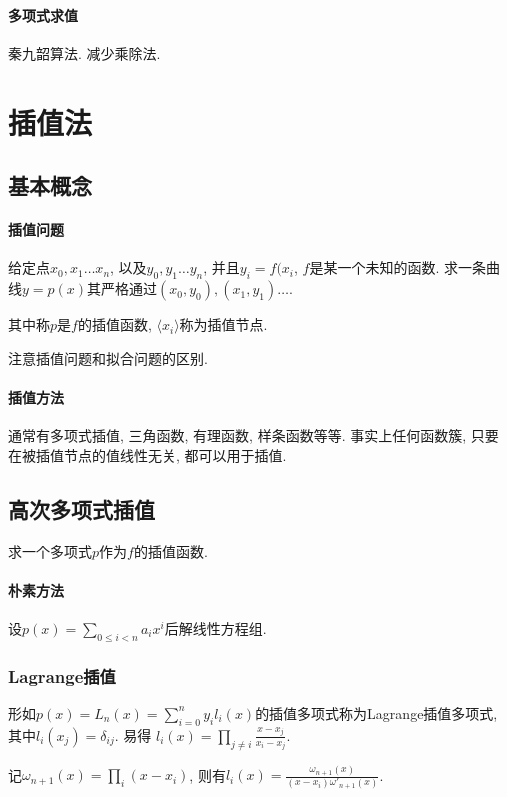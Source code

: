 \documentclass{ctexart}
\newcommand{\Nset}{\mathbb{N}}
\begin{document}
\paragraph{多项式求值} 秦九韶算法. 减少乘除法.



\section{插值法}
\subsection{基本概念}
\paragraph{插值问题} 给定点$x_0, x_1\ldots x_n$, 以及$y_0,y_1\ldots y_n$,
    并且$y_i = f(x_i$, $f$是某一个未知的函数.
    求一条曲线$y=p(x)$其严格通过$(x_0,y_0), (x_1,y_1)\ldots$.\par
    其中称$p$是$f$的插值函数, $\langle x_i \rangle$称为插值节点.\par
    注意插值问题和拟合问题的区别.
\paragraph{插值方法} 通常有多项式插值, 三角函数, 有理函数, 样条函数等等.
    事实上任何函数簇, 只要在被插值节点的值线性无关, 都可以用于插值.
\subsection{高次多项式插值}
    求一个多项式$p$作为$f$的插值函数.
\paragraph{朴素方法} 设$p(x) = \sum_{0 \le i < n} a_i x^i$后解线性方程组.
\subsubsection{Lagrange插值}

    形如$p(x) = L_n(x) = \sum_{i=0}^n y_i l_i(x)$的插值多项式称为Lagrange插值多项式,
    其中$l_i(x_j) = \delta_{ij}$.
    易得 $l_i(x) = \prod_{j \neq i} \frac{x - x_j}{x_i - x_j}$.\par
    记$\omega_{n+1}(x) = \prod_i (x-x_i)$,
    则有$l_i(x) = \frac{\omega_{n+1}(x)}{(x-x_i) \omega'_{n+1}(x)}$.
\end{document}
